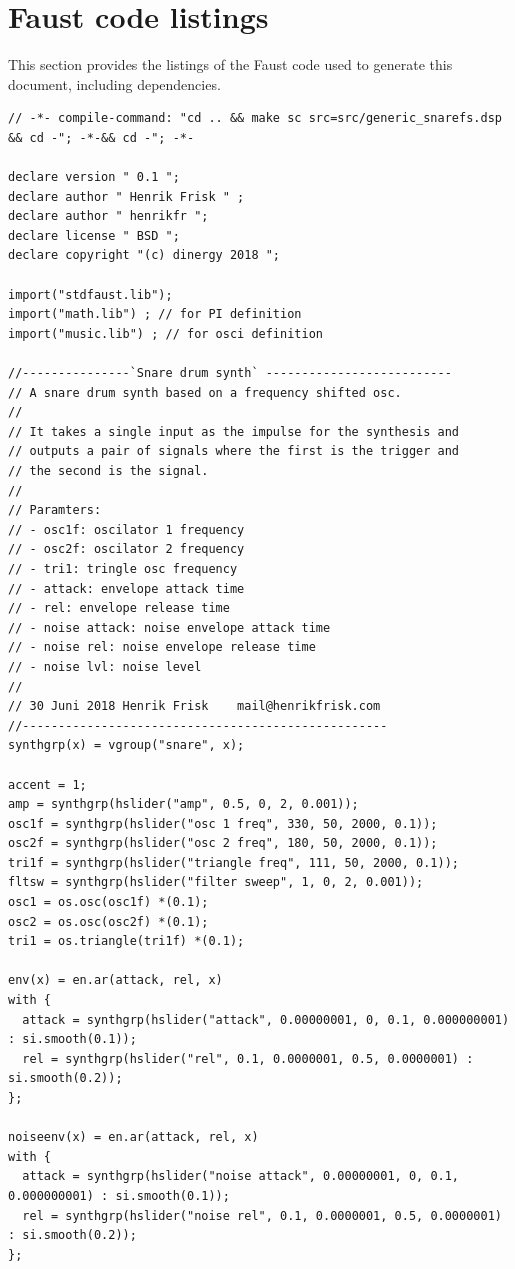 \documentclass{article}
\begin{document}
 \section{Faust code listings} \label{listing}  This section provides the listings of the Faust code used to generate this document, including dependencies. 
\bigskip\bigskip
\begin{lstlisting}[caption=\texttt{generic_snarefs.dsp}]
// -*- compile-command: "cd .. && make sc src=src/generic_snarefs.dsp && cd -"; -*-&& cd -"; -*-

declare version " 0.1 ";
declare author " Henrik Frisk " ;
declare author " henrikfr ";
declare license " BSD ";
declare copyright "(c) dinergy 2018 ";

import("stdfaust.lib");
import("math.lib") ; // for PI definition
import("music.lib") ; // for osci definition

//---------------`Snare drum synth` --------------------------
// A snare drum synth based on a frequency shifted osc.
//
// It takes a single input as the impulse for the synthesis and
// outputs a pair of signals where the first is the trigger and
// the second is the signal.
//
// Paramters:
// - osc1f: oscilator 1 frequency
// - osc2f: oscilator 2 frequency
// - tri1: tringle osc frequency
// - attack: envelope attack time
// - rel: envelope release time
// - noise attack: noise envelope attack time
// - noise rel: noise envelope release time
// - noise lvl: noise level
//
// 30 Juni 2018	Henrik Frisk	mail@henrikfrisk.com
//---------------------------------------------------
synthgrp(x) = vgroup("snare", x);

accent = 1;
amp = synthgrp(hslider("amp", 0.5, 0, 2, 0.001));
osc1f = synthgrp(hslider("osc 1 freq", 330, 50, 2000, 0.1));
osc2f = synthgrp(hslider("osc 2 freq", 180, 50, 2000, 0.1));
tri1f = synthgrp(hslider("triangle freq", 111, 50, 2000, 0.1));
fltsw = synthgrp(hslider("filter sweep", 1, 0, 2, 0.001));
osc1 = os.osc(osc1f) *(0.1);
osc2 = os.osc(osc2f) *(0.1);
tri1 = os.triangle(tri1f) *(0.1);

env(x) = en.ar(attack, rel, x)
with {
  attack = synthgrp(hslider("attack", 0.00000001, 0, 0.1, 0.000000001) : si.smooth(0.1));
  rel = synthgrp(hslider("rel", 0.1, 0.0000001, 0.5, 0.0000001) : si.smooth(0.2));
};

noiseenv(x) = en.ar(attack, rel, x)
with {
  attack = synthgrp(hslider("noise attack", 0.00000001, 0, 0.1, 0.000000001) : si.smooth(0.1));
  rel = synthgrp(hslider("noise rel", 0.1, 0.0000001, 0.5, 0.0000001) : si.smooth(0.2));
};


\end{lstlisting}
\end{document}
